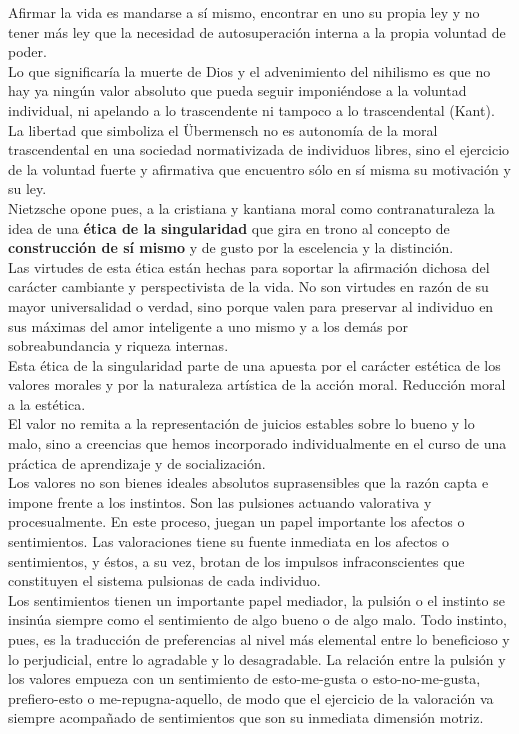 \documentclass[a4paper, 10pt, twocolumn, spanish]{article}
\begin{document}
Afirmar la vida es mandarse a sí mismo, encontrar en uno su propia ley
y no tener más ley que la necesidad de autosuperación interna a la
propia voluntad de poder. \\[0pt]
Lo que significaría la muerte de Dios y el advenimiento del nihilismo
es que no hay ya ningún valor absoluto que pueda seguir imponiéndose a
la voluntad individual, ni apelando a lo trascendente ni tampoco a lo
trascendental (Kant). La libertad que simboliza el Übermensch no es
autonomía de la moral trascendental en una sociedad normativizada de
individuos libres, sino el ejercicio de la voluntad fuerte y
afirmativa que encuentro sólo en sí misma su motivación y su ley.\\[0pt]

Nietzsche opone pues, a la cristiana y kantiana moral como
contranaturaleza la idea de una \textbf{ética de la singularidad} que gira en
trono al concepto de \textbf{construcción de sí mismo} y de gusto por la
escelencia y la distinción.\\[0pt]
Las virtudes de esta ética están hechas para soportar la afirmación
dichosa del carácter cambiante y perspectivista de la vida. No son
virtudes en razón de su mayor universalidad o verdad, sino porque
valen para preservar al individuo en sus máximas del amor inteligente
a uno mismo y a los demás por sobreabundancia y riqueza internas.\\[0pt]

Esta ética de la singularidad parte de una apuesta por el carácter
estética de los valores morales y por la naturaleza artística de la
acción moral. Reducción moral a la estética.\\[0pt]

El valor no remita a la representación de juicios estables sobre lo
bueno y lo malo, sino a creencias que hemos incorporado
individualmente en el curso de una práctica de aprendizaje y de
socialización.\\[0pt]

Los valores no son bienes ideales absolutos suprasensibles que la
razón capta e impone frente a los instintos. Son las pulsiones
actuando valorativa y procesualmente. En este proceso, juegan un papel
importante los afectos o sentimientos. Las valoraciones tiene su
fuente inmediata en los afectos o sentimientos, y éstos, a su vez,
brotan de los impulsos infraconscientes que constituyen el sistema
pulsionas de cada individuo.\\[0pt]
Los sentimientos tienen un importante papel mediador, la pulsión o el
instinto se insinúa siempre como el sentimiento de algo bueno o de
algo malo. Todo instinto, pues, es la traducción de preferencias al
nivel más elemental entre lo beneficioso y lo perjudicial, entre lo
agradable y lo desagradable. La relación entre la pulsión y los
valores empueza con un sentimiento de esto-me-gusta o
esto-no-me-gusta, prefiero-esto o me-repugna-aquello, de modo que el
ejercicio de la valoración va siempre acompañado de sentimientos que
son su inmediata dimensión motriz.\\[0pt]
\end{document}
